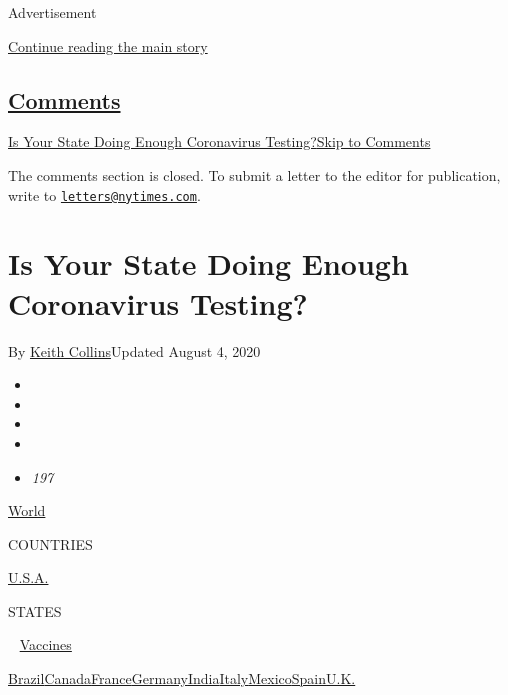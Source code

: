 Advertisement

\protect\hyperlink{after-top}{Continue reading the main story}

\hypertarget{comments}{%
\subsection{\texorpdfstring{\protect\hyperlink{commentsContainer}{Comments}}{Comments}}\label{comments}}

\href{}{Is Your State Doing Enough Coronavirus Testing?}\href{}{Skip to
Comments}

The comments section is closed. To submit a letter to the editor for
publication, write to
\href{mailto:letters@nytimes.com}{\nolinkurl{letters@nytimes.com}}.

\hypertarget{is-your-state-doing-enough-coronavirus-testing}{%
\section{Is Your State Doing Enough Coronavirus
Testing?}\label{is-your-state-doing-enough-coronavirus-testing}}

By \href{https://www.nytimes.com/by/keith-collins}{Keith Collins}Updated
August 4, 2020

\begin{itemize}
\item
\item
\item
\item
\item
  \emph{197}
\end{itemize}

\href{https://www.nytimes.com/interactive/2020/world/coronavirus-maps.html}{World}~

COUNTRIES

\textbar{}
\href{https://www.nytimes.com/interactive/2020/us/coronavirus-us-cases.html}{U.S.A.}~

STATES

~
\href{https://www.nytimes.com/interactive/2020/science/coronavirus-vaccine-tracker.html}{Vaccines}

\href{https://www.nytimes.com/interactive/2020/world/americas/brazil-coronavirus-cases.html}{Brazil}\href{https://www.nytimes.com/interactive/2020/world/canada/canada-coronavirus-cases.html}{Canada}\href{https://www.nytimes.com/interactive/2020/world/europe/france-coronavirus-cases.html}{France}\href{https://www.nytimes.com/interactive/2020/world/europe/germany-coronavirus-cases.html}{Germany}\href{https://www.nytimes.com/interactive/2020/world/asia/india-coronavirus-cases.html}{India}\href{https://www.nytimes.com/interactive/2020/world/europe/italy-coronavirus-cases.html}{Italy}\href{https://www.nytimes.com/interactive/2020/world/americas/mexico-coronavirus-cases.html}{Mexico}\href{https://www.nytimes.com/interactive/2020/world/europe/spain-coronavirus-cases.html}{Spain}\href{https://www.nytimes.com/interactive/2020/world/europe/united-kingdom-coronavirus-cases.html}{U.K.}

